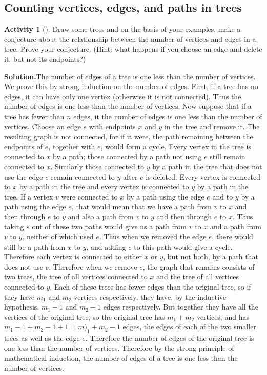 \documentclass[10pt,]{book}
\theoremstyle{plain}
\theoremstyle{definition}
\newtheorem{activity}[project]{Activity}
\numberwithin{equation}{chapter}
\begin{document}
\subsection[{Counting vertices, edges, and paths in trees}]{Counting vertices, edges, and paths in trees}\label{subsection-23}
\begin{activity}[]\label{Noverticesandedgesoftree}
Draw some trees and on the basis of your examples, make a conjecture about the relationship between the number of vertices and edges in a tree. Prove your conjecture. (Hint: what happens if you choose an edge and delete it, but not its endpoints?)%
\par\medskip\noindent%
\textbf{Solution.}\quad The number of edges of a tree is one less than the number of vertices. We prove this by strong induction on the number of edges. First, if a tree has no edges, it can have only one vertex (otherwise it is not connected). Thus the number of edges is one less than the number of vertices. Now suppose that if a tree has fewer than \(n\) edges, it the number of edges is one less than the number of vertices. Choose an edge \(e\) with endpoints \(x\) and \(y\) in the tree and remove it. The resulting graph is not connected, for if it were, the path remaining between the endpoints of \(e\), together with \(e\), would form a cycle. Every vertex in the tree is connected to \(x\) by a path; those connected by a path not using \(e\) still remain connected to \(x\). Similarly those connected to \(y\) by a path in the tree that does not use the edge \(e\) remain connected to \(y\) after \(e\) is deleted. Every vertex is connected to \(x\) by a path in the tree and every vertex is connected to \(y\) by a path in the tree. If a vertex \(v\) were connected to \(x\) by a path using the edge \(e\) and to \(y\) by a path using the edge \(e\), that would mean that we have a path from \(v\) to \(x\) and then through \(e\) to \(y\) and also a path from \(v\) to \(y\) and then through \(e\) to \(x\). Thus taking \(e\) out of these two paths would give us a path from \(v\) to \(x\) and a path from \(v\) to \(y\), neither of which used \(e\). Thus when we removed the edge \(e\), there would still be a path from \(x\) to \(y\), and adding \(e\) to this path would give a cycle. Therefore each vertex is connected to either \(x\) or \(y\), but not both, by a path that does not use \(e\). Therefore when we remove \(e\), the graph that remains consists of two trees, the tree of all vertices connected to \(x\) and the tree of all vertices connected to \(y\). Each of these trees has fewer edges than the original tree, so if they have \(m_1\) and \(m_2\) vertices respectively, they have, by the inductive hypothesis, \(m_1-1\) and \(m_2-1\) edges respectively. But together they have all the vertices of the original tree, so the original tree has \(m_1+m_2\) vertices, and has \(m_1-1+m_2-1 +1=m)_1+m_2-1\) edges, the edges of each of the two smaller trees as well as the edge \(e\). Therefore the number of edges of the original tree is one less than the number of vertices. Therefore by the strong principle of mathematical induction, the number of edges of a tree is one less than the number of vertices.%
\end{activity}
\end{document}
